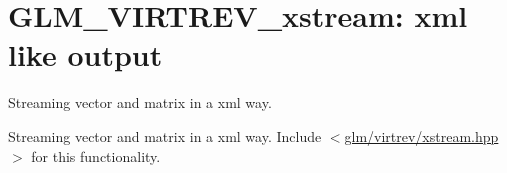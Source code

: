 \hypertarget{group__virtrev__xstream}{\section{\-G\-L\-M\-\_\-\-V\-I\-R\-T\-R\-E\-V\-\_\-xstream\-: xml like output}
\label{group__virtrev__xstream}
}


\-Streaming vector and matrix in a xml way.  


\-Streaming vector and matrix in a xml way. \-Include $<$\hyperlink{xstream_8hpp}{glm/virtrev/xstream.\-hpp}$>$ for this functionality. 